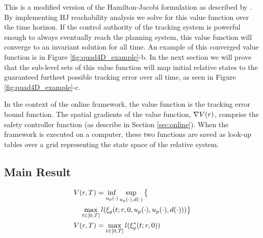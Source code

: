  This is a modified version of the Hamilton-Jacobi formulation as described by \cite{Fisac15}. By implementing HJ reachability analysis we solve for this value function over the time horizon. If the control authority of the tracking system is powerful enough to always eventually reach the planning system, this value function will converge to an invariant solution for all time. An example of this converged value function is in Figure \ref{fig:quad4D_example}-b. In the next section we will prove that the sub-level sets of this value function will map initial relative states to the guaranteed furthest possible tracking error over all time, as seen in Figure \ref{fig:quad4D_example}-c.
 
In the context of the online framework, the value function is the tracking error bound function. The spatial gradients of the value function, $\nabla V(r)$, comprise the safety controller function (as describe in Section \ref{sec:online}). When the framework is executed on a computer, these two functions are saved as look-up tables over a grid representing the state space of the relative system.
 
\subsection{Main Result}
 \begin{equation}
 \begin{aligned}
& V(r, T) = \inf_{u_p(\cdot)} \sup_{u_p(\cdot), d(\cdot)} \big\{\\
&\quad \max_{t \in [0, T]} l(\xi_g(t; r, 0, u_p(\cdot), u_p(\cdot), d(\cdot)))\big\} \\
& V(r, T) = \max_{t \in [0, T]} l(\xi_g^*(t; r, 0)) 
 \end{aligned}
  \end{equation}
 
